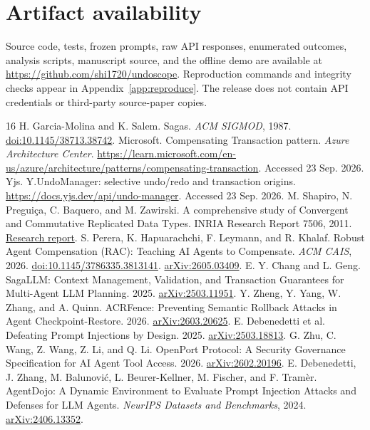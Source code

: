 \documentclass[10pt,twocolumn]{article}
\begin{document}
\balance
\section*{Artifact availability}
Source code, tests, frozen prompts, raw API responses, enumerated outcomes, analysis scripts, manuscript source, and the offline demo are available at \url{https://github.com/shi1720/undoscope}. Reproduction commands and integrity checks appear in Appendix~\ref{app:reproduce}. The release does not contain API credentials or third-party source-paper copies.

\begin{thebibliography}{16}\footnotesize\setlength{\itemsep}{2pt}\setlength{\parskip}{0pt}
 H. Garcia-Molina and K. Salem. Sagas. \emph{ACM SIGMOD}, 1987. \href{https://doi.org/10.1145/38713.38742}{doi:10.1145/38713.38742}.
 Microsoft. Compensating Transaction pattern. \emph{Azure Architecture Center}. \url{https://learn.microsoft.com/en-us/azure/architecture/patterns/compensating-transaction}. Accessed 23 Sep. 2026.
 Yjs. Y.UndoManager: selective undo/redo and transaction origins. \url{https://docs.yjs.dev/api/undo-manager}. Accessed 23 Sep. 2026.
 M. Shapiro, N. Pregui\c{c}a, C. Baquero, and M. Zawirski. A comprehensive study of Convergent and Commutative Replicated Data Types. INRIA Research Report 7506, 2011. \href{https://dsf.berkeley.edu/cs286/papers/crdt-tr2011.pdf}{Research report}.
 S. Perera, K. Hapuarachchi, F. Leymann, and R. Khalaf. Robust Agent Compensation (RAC): Teaching AI Agents to Compensate. \emph{ACM CAIS}, 2026. \href{https://doi.org/10.1145/3786335.3813141}{doi:10.1145/3786335.3813141}. \href{https://arxiv.org/abs/2605.03409}{arXiv:2605.03409}.
 E. Y. Chang and L. Geng. SagaLLM: Context Management, Validation, and Transaction Guarantees for Multi-Agent LLM Planning. 2025. \href{https://arxiv.org/abs/2503.11951}{arXiv:2503.11951}.
 Y. Zheng, Y. Yang, W. Zhang, and A. Quinn. ACRFence: Preventing Semantic Rollback Attacks in Agent Checkpoint-Restore. 2026. \href{https://arxiv.org/abs/2603.20625}{arXiv:2603.20625}.
 E. Debenedetti et al. Defeating Prompt Injections by Design. 2025. \href{https://arxiv.org/abs/2503.18813}{arXiv:2503.18813}.
 G. Zhu, C. Wang, Z. Wang, Z. Li, and Q. Li. OpenPort Protocol: A Security Governance Specification for AI Agent Tool Access. 2026. \href{https://arxiv.org/abs/2602.20196}{arXiv:2602.20196}.
 E. Debenedetti, J. Zhang, M. Balunovi\'{c}, L. Beurer-Kellner, M. Fischer, and F. Tram\`er. AgentDojo: A Dynamic Environment to Evaluate Prompt Injection Attacks and Defenses for LLM Agents. \emph{NeurIPS Datasets and Benchmarks}, 2024. \href{https://arxiv.org/abs/2406.13352}{arXiv:2406.13352}.

\end{thebibliography}
\end{document}

